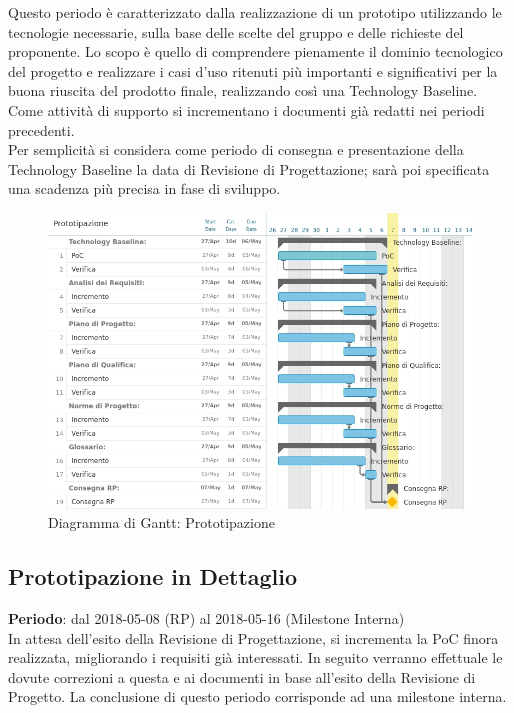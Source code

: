 Questo periodo è caratterizzato dalla realizzazione di un prototipo utilizzando le tecnologie necessarie, sulla base delle scelte del gruppo \Gruppo e delle richieste del proponente.
Lo scopo è quello di comprendere pienamente il dominio tecnologico del progetto e realizzare i casi d'uso ritenuti più importanti e significativi per la buona riuscita del prodotto finale, realizzando così una Technology Baseline. \\ 
Come attività di supporto si incrementano i documenti già redatti nei periodi precedenti.\\
Per semplicità si considera come periodo di consegna e presentazione della Technology Baseline la data di Revisione di Progettazione; sarà poi specificata una scadenza più precisa in fase di sviluppo.

\begin{figure}[h!]
	\centerline{\includegraphics[scale=0.5]{img/DiagrammiGantt/Prototipazione.jpg}}
	\caption{Diagramma di Gantt: Prototipazione}
	\label{fig:gantt_prot}
\end{figure}
\clearpage

\subsection{Prototipazione in Dettaglio}
\textbf{Periodo}: dal 2018-05-08 (RP) al 2018-05-16 (Milestone Interna)\\

In attesa dell'esito della Revisione di Progettazione, si incrementa la PoC finora realizzata, migliorando i requisiti già interessati. In seguito verranno effettuale le dovute correzioni a questa e ai documenti in base all'esito della Revisione di Progetto. La conclusione di questo periodo corrisponde ad una milestone interna.

